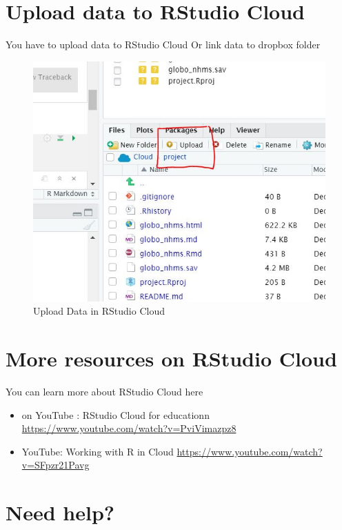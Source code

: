 \documentclass[
]{book}
\begin{document}
\hypertarget{upload-data-to-rstudio-cloud}{%
\section{Upload data to RStudio Cloud}\label{upload-data-to-rstudio-cloud}}

You have to upload data to RStudio Cloud Or link data to dropbox folder

\begin{figure}
\centering
\includegraphics{upload_data.jpg}
\caption{Upload Data in RStudio Cloud}
\end{figure}

\hypertarget{more-resources-on-rstudio-cloud}{%
\section{More resources on RStudio Cloud}\label{more-resources-on-rstudio-cloud}}

You can learn more about RStudio Cloud here

\begin{itemize}
\item
  on YouTube : RStudio Cloud for educationn \url{https://www.youtube.com/watch?v=PviVimazpz8}
\item
  YouTube: Working with R in Cloud \url{https://www.youtube.com/watch?v=SFpzr21Pavg}
\end{itemize}

\hypertarget{need-help}{%
\section{Need help?}\label{need-help}}
\end{document}
